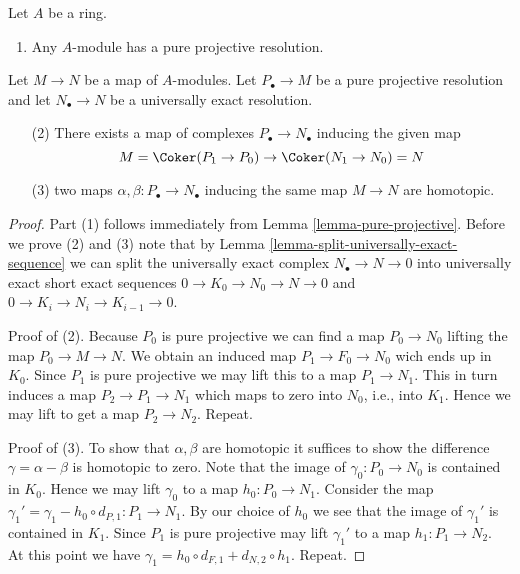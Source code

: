 \begin{lemma}
\label{lemma-pure-projective-resolutions}
Let $A$ be a ring.
\begin{enumerate}
\item Any $A$-module has a pure projective resolution.
\end{enumerate}
Let $M \to N$ be a map of $A$-modules.
Let $P_\bullet \to M$ be a pure projective resolution and
let $N_\bullet \to N$ be a universally exact resolution.
\begin{enumerate}
\item[(2)] There exists a map of complexes $P_\bullet \to N_\bullet$
inducing the given map
$$
M = \Coker(P_1 \to P_0) \to \Coker(N_1 \to N_0) = N
$$
\item[(3)] two maps $\alpha, \beta : P_\bullet \to N_\bullet$
inducing the same map $M \to N$ are homotopic.
\end{enumerate}
\end{lemma}

\begin{proof}
Part (1) follows immediately from
Lemma \ref{lemma-pure-projective}.
Before we prove (2) and (3) note that by
Lemma \ref{lemma-split-universally-exact-sequence}
we can split the universally exact complex $N_\bullet \to N \to 0$
into universally exact short exact sequences $0 \to K_0 \to N_0 \to N \to 0$
and $0 \to K_i \to N_i \to K_{i - 1} \to 0$.

\medskip\noindent
Proof of (2). Because $P_0$ is pure projective
we can find a map $P_0 \to N_0$ lifting the map $P_0 \to M \to N$.
We obtain an induced map $P_1 \to F_0 \to N_0$ wich ends up in $K_0$.
Since $P_1$ is pure projective we may lift this
to a map $P_1 \to N_1$. This in turn induces a map
$P_2 \to P_1 \to N_1$ which maps to zero into
$N_0$, i.e., into $K_1$. Hence we may lift to get a map
$P_2 \to N_2$. Repeat.

\medskip\noindent
Proof of (3). To show that $\alpha, \beta$ are homotopic it suffices
to show the difference $\gamma = \alpha - \beta$ is homotopic
to zero. Note that the image of $\gamma_0 : P_0 \to N_0$
is contained in $K_0$. Hence we may lift
$\gamma_0$ to a map $h_0 : P_0 \to N_1$. Consider the map
$\gamma_1' = \gamma_1 - h_0 \circ d_{P, 1} : P_1 \to N_1$.
By our choice of $h_0$ we see that the image of $\gamma_1'$
is contained in $K_1$. Since $P_1$ is pure projective may lift
$\gamma_1'$ to a map $h_1 : P_1 \to N_2$. At this point we have
$\gamma_1 = h_0 \circ d_{F, 1} + d_{N, 2} \circ h_1$. Repeat.
\end{proof}

